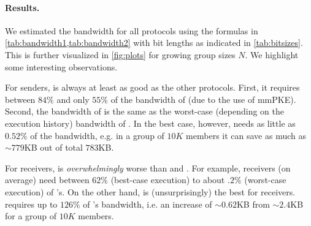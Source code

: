 \paragraph{Results.}
We estimated the bandwidth for all protocols using the formulas in \cref{tab:bandwidth1,tab:bandwidth2} with bit lengths
as indicated in \cref{tab:bitsizes}. This is further visualized in \cref{fig:plots} for growing group sizes $N$.
%
%
We highlight some interesting observations. %

For senders, \saik is always at least as good as the other protocols. First, it requires between $84\%$ and only $55\%$
of the bandwidth of \protITK (due to the use of mmPKE). Second, the bandwidth of \protCMPKE is the same as the
worst-case (depending on the execution history) bandwidth of \saik. In the best case, however, \saik needs as little as
$0.52\%$ of the bandwidth, e.g. in a group of $10K$ members it can save as much as $\sim 779$KB out of total
$783$KB.





For receivers, \protITK is \emph{overwhelmingly} worse than \saik and \protCMPKE. For
example, \saik receivers (on average) need between $62\%$ (best-case execution) to about $.2\%$ (worst-case execution)
of \protITK's. On the other hand, \protCMPKE is (unsurprisingly) the best for receivers.  \saik requires up to $126\%$
of \protCMPKE's bandwidth, i.e. an increase of $\sim 0.62$KB from $\sim 2.4$KB for a group of $10K$ members.


